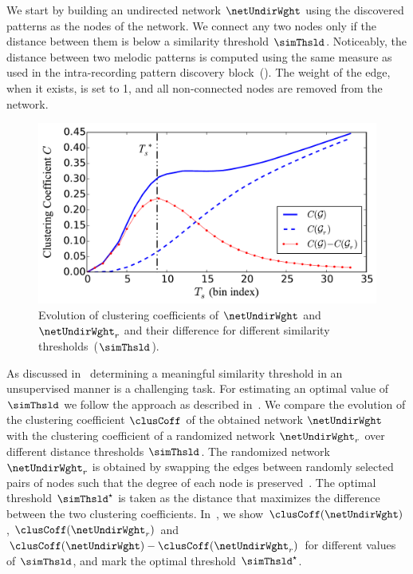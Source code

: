 We start by building an undirected network $\netUndirWght$ using the discovered patterns as the nodes of the network. We connect any two nodes only if the distance between them is below a similarity threshold $\simThsld$. Noticeably, the distance between two melodic patterns is computed using the same measure as used in the intra-recording pattern discovery block~(). The weight of the edge, when it exists, is set to 1, and all non-connected nodes are removed from the network.

\begin{figure}
	\begin{center}
		\includegraphics[width=\figSizeEightyFive]{ch07_ragaRecognition/figures/ClusteringCoffs_40raga_2s.pdf}
	\end{center}
	\caption[Evolution of $\clusCoff(\netUndirWght)$, $\clusCoff(\netUndirWght_r)$ and $\clusCoff(\netUndirWght)$ - $\clusCoff(\netUndirWght_r)$ over values of $\simThsld$]{Evolution of clustering coefficients of $\netUndirWght$ and $\netUndirWght_r$ and their difference for different similarity thresholds~($\simThsld$).}
	\label{fig:raga_rec_clustering_coff_evolution}
\end{figure}

As discussed in~ determining a meaningful similarity threshold in an unsupervised manner is a challenging task. For estimating an optimal value of $\simThsld$ we follow the approach as described in~. We compare the evolution of the clustering coefficient $\clusCoff$ of the obtained network $\netUndirWght$ with the clustering coefficient of a randomized network $\netUndirWght_r$ over different distance thresholds $\simThsld$. The randomized network $\netUndirWght_r$ is obtained by swapping the edges between randomly selected pairs of nodes such that the degree of each node is preserved~\citep{maslov2002specificity}. The optimal threshold $\simThsld^\star$ is taken as the distance that maximizes the difference between the two clustering coefficients.  In~, we show $\clusCoff(\netUndirWght)$, $\clusCoff(\netUndirWght_r)$ and $\clusCoff(\netUndirWght)-\clusCoff(\netUndirWght_r)$ for different values of $\simThsld$, and mark the optimal threshold $\simThsld^\star$.


